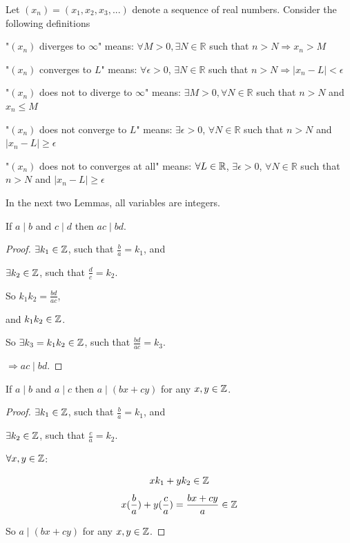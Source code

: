 \documentclass[12pt]{article}
\begin{document}
\vfill
\hrulefill
\vfill
Let $(x_n) = (x_1,x_2,x_3,...)$ denote a sequence of real
numbers. Consider the following definitions\\
\begin{Definition}
"$(x_n)$ diverges to $\infty$" means:
$ \forall M > 0, \exists N \in \mathbb{R}$ such that $n > N
\Rightarrow x_n > M$
\end{Definition}
\begin{Definition}
"$(x_n)$ converges to $L$" means: $\forall \epsilon > 0$, $\exists N \in \mathbb{R}$ such
that $n > N \Rightarrow |x_n - L| < \epsilon$
\end{Definition}
\begin{Definition}
"$(x_n)$ does not to diverge to $\infty$" means: $ \exists M > 0, \forall N \in \mathbb{R}$ such that $n > N$
and $x_n \leq M$
\end{Definition}
\begin{Definition}
"$(x_n)$ does not converge to $L$" means: $\exists \epsilon > 0$, $\forall N \in \mathbb{R}$ such
that $n > N$ and $|x_n - L| \geq \epsilon$
\end{Definition}
\begin{Definition}
"$(x_n)$ does not to converges at all" means: $\forall L \in \mathbb{R}$, $\exists \epsilon > 0$, $\forall N \in \mathbb{R}$ such
that $n > N$ and $|x_n - L| \geq \epsilon$
\end{Definition}
\vfill
\hrulefill
\vfill
In the next two Lemmas, all variables are integers.
\begin{Lemma} If $a\mid b$ and $c\mid d$ then $ac\mid bd$.
\end{Lemma}
\begin{proof}
$\exists k_1 \in \mathbb{Z}$, such that $\frac{b}{a} = k_1$, and

$\exists k_2 \in \mathbb{Z}$, such that $\frac{d}{c} = k_2$.

So $k_1k_2 = \frac{bd}{ac}$,

and $k_1k_2 \in \mathbb{Z}$.

So $\exists k_3=k_1k_2 \in \mathbb{Z}$, such that $\frac{bd}{ac} = k_3$.

$\Rightarrow ac \mid bd$. 
\end{proof}
\vfill
\begin{Lemma}
If $a\mid b$ and $a\mid c$ then $a\mid (bx+cy)$ for any $x, y\in
\mathbb{Z}$.
\end{Lemma}
\begin{proof}
$\exists k_1 \in \mathbb{Z}$, such that $\frac{b}{a} = k_1$, and

$\exists k_2 \in \mathbb{Z}$, such that $\frac{c}{a} = k_2$.

$\forall x,y \in \mathbb{Z}$:

\[
xk_1+yk_2 \in \mathbb{Z}
\]
\[
x(\frac{b}{a})+y(\frac{c}{a})=\frac{bx+cy}{a} \in \mathbb{Z}
\]

So $a\mid (bx+cy)$ for any $x, y\in
\mathbb{Z}$.
\end{proof}
\end{document}
